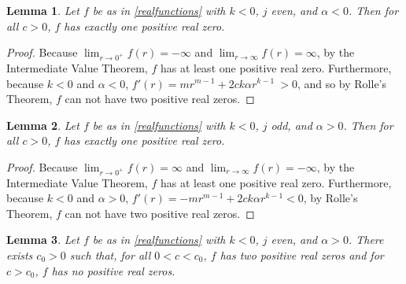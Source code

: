 \documentclass{amsart}
\newtheorem{lemma}{Lemma}
\theoremstyle{definition}
\theoremstyle{remark}
\begin{document}
\begin{lemma}\label{lemma: k neg, j even, alpha neg}
  Let $f$ be as in \eqref{realfunctions} with $k<0$, $j$ even, and $\alpha <0$. Then for all $c>0$, $f$ has exactly one positive real zero. 
\end{lemma}

    \begin{proof}
    Because $\lim_{r \to 0^+} f(r) = -\infty$ and $\lim_{r \to \infty} f(r) = \infty$, by the Intermediate Value Theorem, $f$ has at least one positive real zero. Furthermore, because $k<0$ and $\alpha <0$, $f'(r) = mr^{m-1}+2 c k \alpha r^{k-1}\ > 0$, and so by Rolle's Theorem, $f$ can not have two positive real zeros. 
    \end{proof}

\begin{lemma}\label{lemma: k neg, j odd, alpha pos}
  Let $f$ be as in \eqref{realfunctions} with $k<0$, $j$ odd, and $\alpha > 0$. Then for all $c>0$, $f$ has exactly one positive real zero. 
\end{lemma}

    \begin{proof}
    Because $\lim_{r \to 0^+} f(r) = \infty$ and $\lim_{r \to \infty} f(r) = -\infty$, by the Intermediate Value Theorem, $f$ has at least one positive real zero.  Furthermore, because $k<0$ and $\alpha>0$, $f'(r) = -mr^{m-1}+ 2 c k \alpha r^{k-1} < 0$, by Rolle's Theorem, $f$ can not have two positive real zeros.
    \end{proof}

\begin{lemma}\label{lemma: k neg, j even, alpha pos}
  Let $f$ be as in \eqref{realfunctions} with $k<0$, $j$ even, and $\alpha > 0$. There exists $c_0>0$ such that, for all $0<c <c_0$, $f$ has two positive real zeros and for $c>c_0$, $f$ has no positive real zeros. 
\end{lemma}
\end{document}
